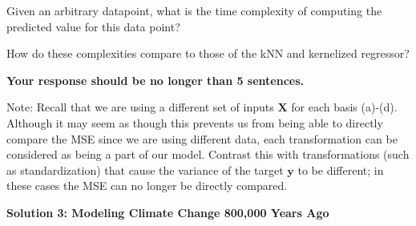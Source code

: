 \documentclass[submit]{harvardml}
\begin{document}
\begin{framed}
\begin{enumerate}
Given an arbitrary datapoint, what is the time complexity of computing the predicted value for this data point?

How do these complexities compare to those of the kNN and kernelized regressor?

\textbf{Your response should be no longer than 5 sentences.}

\end{enumerate}
Note:
Recall that we are using a 
different set of inputs $\mathbf{X}$ for each basis (a)-(d). 
Although it may seem as though this prevents us from being able 
to directly compare the MSE since we are using different data, 
each transformation can be considered as being a part of our model. 
Contrast this with transformations (such as standardization) that cause the variance
of the target $\mathbf{y}$ to be different; in these cases the
MSE can no longer be directly compared.

\end{framed}

\newpage

\textbf{Solution 3: Modeling Climate Change 800,000 Years Ago}
\end{document}
